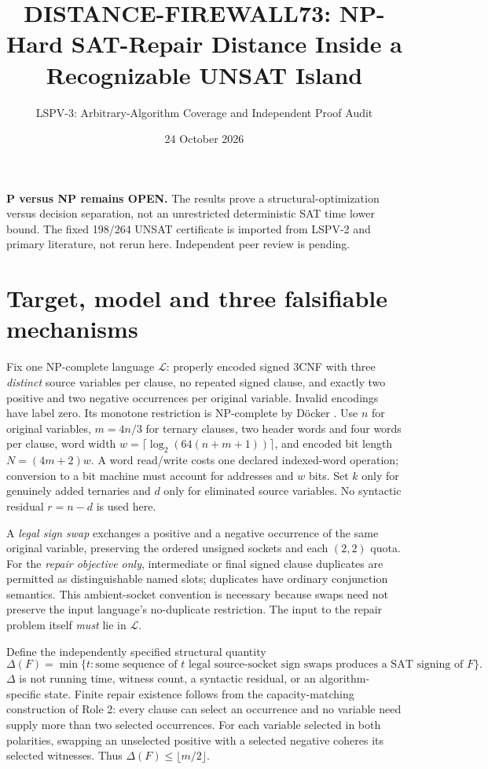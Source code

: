 \documentclass[11pt]{article}
\title{DISTANCE-FIREWALL73: NP-Hard SAT-Repair Distance Inside a Recognizable UNSAT Island}
\author{LSPV-3: Arbitrary-Algorithm Coverage and Independent Proof Audit}
\date{24 October 2026}
\begin{document}
\maketitle
\begin{center}
\textbf{P versus NP remains OPEN.} The results prove a structural-optimization versus decision separation, not an unrestricted deterministic SAT time lower bound. The fixed 198/264 UNSAT certificate is imported from LSPV-2 and primary literature, not rerun here. Independent peer review is pending.
\end{center}

\section{Target, model and three falsifiable mechanisms}
Fix one NP-complete language \(\mathcal L\): properly encoded signed 3CNF with three \emph{distinct} source variables per clause, no repeated signed clause, and exactly two positive and two negative occurrences per original variable. Invalid encodings have label zero. Its monotone restriction is NP-complete by D\"ocker \cite{Docker}. Use \(n\) for original variables, \(m=4n/3\) for ternary clauses, two header words and four words per clause, word width \(w=\lceil\log_2(64(n+m+1))\rceil\), and encoded bit length \(N=(4m+2)w\). A word read/write costs one declared indexed-word operation; conversion to a bit machine must account for addresses and \(w\) bits. Set \(k\) only for genuinely added ternaries and \(d\) only for eliminated source variables. No syntactic residual \(r=n-d\) is used here.

A \emph{legal sign swap} exchanges a positive and a negative occurrence of the same original variable, preserving the ordered unsigned sockets and each \((2,2)\) quota. For the \emph{repair objective only}, intermediate or final signed clause duplicates are permitted as distinguishable named slots; duplicates have ordinary conjunction semantics. This ambient-socket convention is necessary because swaps need not preserve the input language's no-duplicate restriction. The input to the repair problem itself \emph{must} lie in \(\mathcal L\).

Define the independently specified structural quantity
\[
\Delta(F)=\min\{t:\text{some sequence of }t\text{ legal source-socket sign swaps
 produces a SAT signing of }F\}.
\tag{1}
\]
\(\Delta\) is not running time, witness count, a syntactic residual, or an algorithm-specific state. Finite repair existence follows from the capacity-matching construction of Role 2: every clause can select an occurrence and no variable need supply more than two selected occurrences. For each variable selected in both polarities, swapping an unselected positive with a selected negative coheres its selected witnesses. Thus \(\Delta(F)\le\lfloor m/2\rfloor\).
\end{document}
